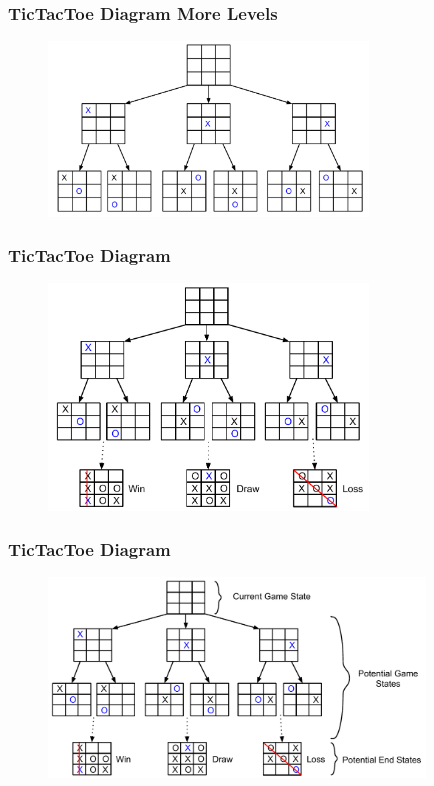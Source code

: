 \documentclass{beamer}
\begin{document}
\begin{frame}[fragile]
\frametitle{TicTacToe Diagram More Levels}
\begin{figure}[h]
	\includegraphics[width=8.5cm]{Diagrams/TicTacToe/TicTacToeTreeMultiLevel.pdf}
	\centering
\end{figure}
\end{frame}

\begin{frame}[fragile]
\frametitle{TicTacToe Diagram}
\begin{figure}[h]
	\includegraphics[width=8.5cm]{Diagrams/TicTacToe/TicTacToeTreeExtended.pdf}
	\centering
\end{figure}
\end{frame}

\begin{frame}[fragile]
\frametitle{TicTacToe Diagram}
\begin{figure}[h]
	\includegraphics[width=10cm]{Diagrams/TicTacToe/TicTacToeTreeExtendedLabeled.pdf}
	\centering
\end{figure}
\end{frame}
\end{document}
